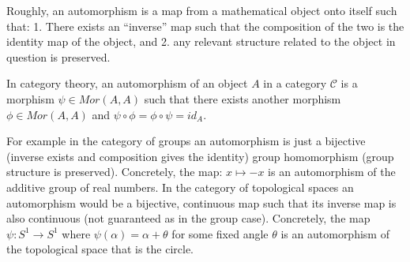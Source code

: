 \documentclass[12pt]{article}
\begin{document}
Roughly, an automorphism is a map from a mathematical object onto itself such that: 1. There exists an ``inverse'' map such that the composition of the two is the identity map of the object, and 2. any relevant structure related to the object in question is preserved.

In category theory, an automorphism of an object $A$ in a category $\mathcal{C}$ is a morphism $\psi \in Mor(A, A)$ such that there exists another morphism $\phi \in Mor(A, A)$ and $\psi \circ \phi = \phi \circ \psi = id_{A}$. 

For example in the category of groups an automorphism is just a bijective (inverse exists and composition gives the identity) group homomorphism (group structure is preserved). Concretely, the map: $x \mapsto -x$ is an automorphism of the additive group of real numbers. In the category of topological spaces an automorphism would be a bijective, continuous map such that its inverse map is also continuous (not guaranteed as in the group case). Concretely, the map $\psi: S^1 \to S^1$ where $\psi(\alpha) = \alpha + \theta$ for some fixed angle $\theta$ is an automorphism of the topological space that is the circle.
\end{document}

